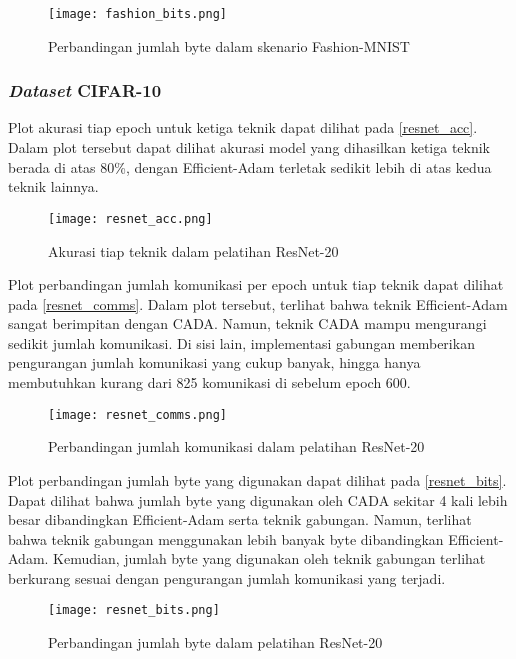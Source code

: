 \begin{figure}[H]
  \centering
  \texttt{[image: fashion\_bits.png]}
  \caption{Perbandingan jumlah byte dalam skenario Fashion-MNIST}\label{fashion_bits}
\end{figure}


\subsubsection{\emph{Dataset} CIFAR-10}

Plot akurasi tiap epoch untuk ketiga teknik dapat dilihat pada \autoref{resnet_acc}. Dalam plot tersebut dapat dilihat akurasi model yang dihasilkan ketiga teknik berada di atas 80\%, dengan Efficient-Adam terletak sedikit lebih di atas kedua teknik lainnya.

\begin{figure}[H]
  \centering
  \texttt{[image: resnet\_acc.png]}
  \caption{Akurasi tiap teknik dalam pelatihan ResNet-20}\label{resnet_acc}
\end{figure}

Plot perbandingan jumlah komunikasi per epoch untuk tiap teknik dapat dilihat pada \autoref{resnet_comms}. Dalam plot tersebut, terlihat bahwa teknik Efficient-Adam sangat berimpitan dengan CADA. Namun, teknik CADA mampu mengurangi sedikit jumlah komunikasi. Di sisi lain, implementasi gabungan memberikan pengurangan jumlah komunikasi yang cukup banyak, hingga hanya membutuhkan kurang dari 825 komunikasi di sebelum epoch 600.

\begin{figure}[H]
  \centering
  \texttt{[image: resnet\_comms.png]}
  \caption{Perbandingan jumlah komunikasi dalam pelatihan ResNet-20}\label{resnet_comms}
\end{figure}

Plot perbandingan jumlah byte yang digunakan dapat dilihat pada \autoref{resnet_bits}. Dapat dilihat bahwa jumlah byte yang digunakan oleh CADA sekitar 4 kali lebih besar dibandingkan Efficient-Adam serta teknik gabungan. Namun, terlihat bahwa teknik gabungan menggunakan lebih banyak byte dibandingkan Efficient-Adam. Kemudian, jumlah byte yang digunakan oleh teknik gabungan terlihat berkurang sesuai dengan pengurangan jumlah komunikasi yang terjadi.

\begin{figure}[H]
  \centering
  \texttt{[image: resnet\_bits.png]}
  \caption{Perbandingan jumlah byte dalam pelatihan ResNet-20}\label{resnet_bits}
\end{figure}


